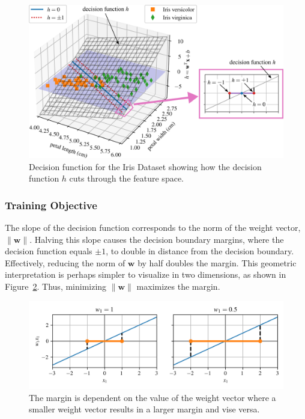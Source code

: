 \documentclass[12pt,letter]{article}
\begin{document}
\begin{figure}[H]
	\centering
	\includegraphics[]{../figures/SVM_decision_function}
	\caption{Decision function for the Iris Dataset showing how the decision function $h$ cuts through the feature space.}
	\label{fig:SVM_decision_function}
\end{figure}

\pagebreak

\subsubsection{Training Objective}

The slope of the decision function corresponds to the norm of the weight vector, $\|\textbf{w}\|$. Halving this slope causes the decision boundary margins, where the decision function equals $\pm 1$, to double in distance from the decision boundary. Effectively, reducing the norm of $\textbf{w}$ by half doubles the margin. This geometric interpretation is perhaps simpler to visualize in two dimensions, as shown in Figure~\ref{fig:SVM_weight_vectors}. Thus, minimizing $\|\textbf{w}\|$ maximizes the margin.

\begin{figure}[H]
	\centering
	\includegraphics[width=6.5in]{../figures/SVM_weight_vectors}
	\caption{The margin is dependent on the value of the weight vector where a smaller weight vector results in a larger margin and vise versa.}
	\label{fig:SVM_weight_vectors}
\end{figure}
\end{document}
